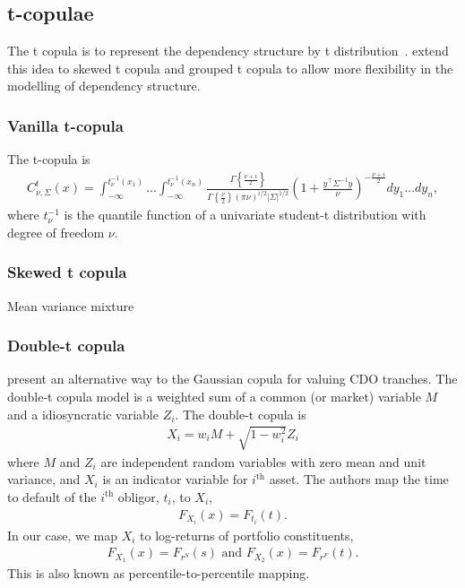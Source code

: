 \subsection{t-copulae}\label{subsec:t-copulae}
The t copula is to represent the dependency structure by t distribution~\citep{fang2002meta, embrechts2002correlation}.
\cite{demarta2005t} extend this idea to skewed t copula and grouped t copula to allow more flexibility in the modelling of dependency structure.

\subsubsection{Vanilla t-copula}\label{subsec:vanilla-t-copula}
The t-copula is
\begin{align}
    C^t_{\nu, \Sigma}(x) =
    \int_{-\infty}^{t_\nu^{-1}(x_1)} \dots \int_{-\infty}^{t_\nu^{-1}(x_n)}
    \frac{\Gamma\left\{ \frac{\nu + i}{2}\right\}}{\Gamma \left\{\frac{\nu}{2}\right\} (\pi \nu)^{i/2}|\Sigma|^{1/2}}
    \left(
    1+ \frac{y^\top \Sigma^{-1}y}{\nu}
    \right)^{-\frac{\nu + i}{2}}
    dy_1 \dots dy_n,
    \end{align}
where $t^{-1}_\nu$ is the quantile function of a univariate student-t distribution with degree of freedom $\nu$.

\subsubsection{Skewed t copula}\label{subsec:skewed-t-copula}
Mean variance mixture

\subsubsection{Double-t copula}\label{subsec:double-t-copula}
\cite{hull2006valuing} present an alternative way to the Gaussian copula for valuing CDO tranches.
The double-t copula model is a weighted sum of a common (or market)
variable $M$ and a idiosyncratic variable $Z_i$. 
The double-t copula is
\begin{align} \label{eq:one-fator-model}
X_i = w_i M + \sqrt{1-w_i^2} Z_i
\end{align}
where $M$ and $Z_i$ are independent random variables with zero mean and unit variance, and $X_i$ is an indicator variable for $i^\text{th}$ asset.
The authors map the time to default of the $i^\text{th}$ obligor, $t_i$, to $X_i$,
\begin{align}
    F_{X_i}(x) = F_{t_i}(t).
    \end{align}
In our case, we map $X_i$ to log-returns of portfolio constituents,
\begin{align}
    F_{X_1}(x) = F_{r^S}(s) \text{ and } F_{X_2}(x) = F_{r^F}(t).
    \end{align}
This is also known as percentile-to-percentile
mapping\citep{hull2006defining}.


